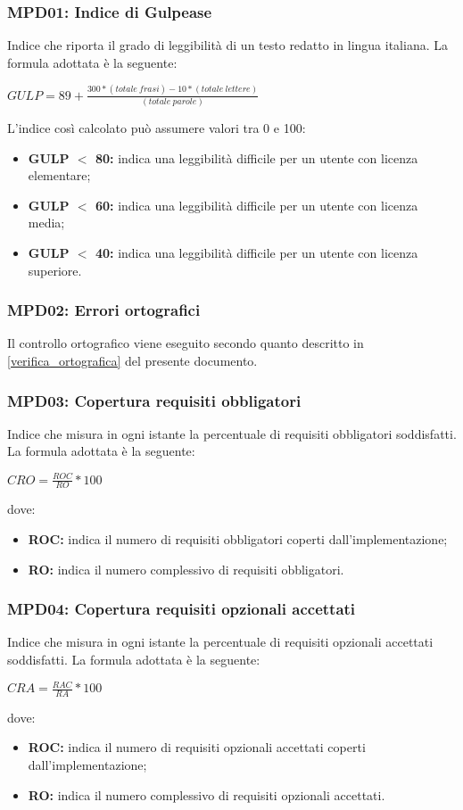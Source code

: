 \subsubsection{MPD01: Indice di Gulpease}
Indice che riporta il grado di leggibilità di un testo redatto in lingua italiana.
La formula adottata è la seguente:
\begin{center}
    $GULP = 89 + \displaystyle \frac{300*(totale\ frasi)-10*(totale\ lettere)}{(totale\ parole)}$
\end{center}
L’indice così calcolato può assumere valori tra 0 e 100:
\begin{itemize}
    \item \textbf{GULP $<$ 80:} indica una leggibilità difficile per un utente con licenza elementare;
    \item \textbf{GULP $<$ 60:} indica una leggibilità difficile per un utente con licenza media;
    \item \textbf{GULP $<$ 40:} indica una leggibilità difficile per un utente con licenza superiore.
\end{itemize}

\subsubsection{MPD02: Errori ortografici}
Il controllo ortografico viene eseguito secondo quanto descritto in \ref{verifica_ortografica} del presente documento.

\subsubsection{MPD03: Copertura requisiti obbligatori}
Indice che misura in ogni istante la percentuale di requisiti obbligatori soddisfatti.
La formula adottata è la seguente:
\begin{center}
    $CRO = \displaystyle \frac{ROC}{RO}*100$
\end{center}
dove:
\begin{itemize}
    \item \textbf{ROC:} indica il numero di requisiti obbligatori coperti dall'implementazione;
    \item \textbf{RO:} indica il numero complessivo di requisiti obbligatori.
\end{itemize}

\subsubsection{MPD04: Copertura requisiti opzionali accettati}
Indice che misura in ogni istante la percentuale di requisiti opzionali accettati soddisfatti.
La formula adottata è la seguente:
\begin{center}
    $CRA = \displaystyle \frac{RAC}{RA}*100$
\end{center}
dove:
\begin{itemize}
    \item \textbf{ROC:} indica il numero di requisiti opzionali accettati coperti dall'implementazione;
    \item \textbf{RO:} indica il numero complessivo di requisiti opzionali accettati.
\end{itemize}

